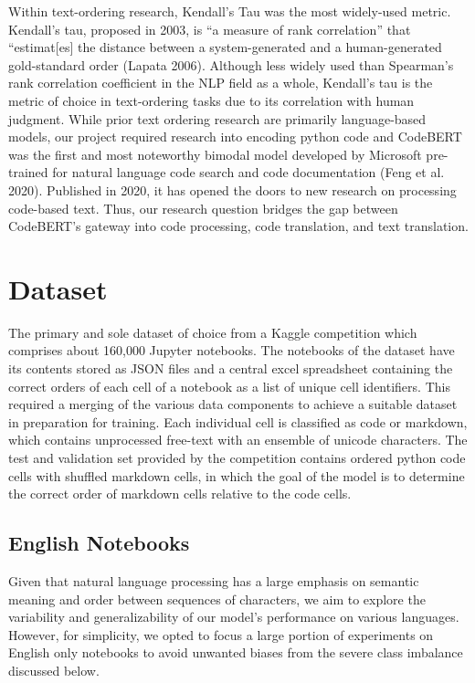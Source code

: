 \documentclass[conference]{IEEEtran}
\begin{document}
Within text-ordering research, Kendall’s Tau was the most widely-used metric. Kendall’s tau, proposed in 2003, is “a measure of rank correlation” that “estimat[es] the distance between a system-generated and a human-generated gold-standard order (Lapata 2006). Although less widely used than Spearman’s rank correlation coefficient in the NLP field as a whole, Kendall’s tau is the metric of choice in text-ordering tasks due to its correlation with human judgment. While prior text ordering research are primarily language-based models, our project required research into encoding python code and CodeBERT was the first and most noteworthy bimodal model developed by Microsoft pre-trained for natural language code search and code documentation (Feng et al. 2020). Published in 2020, it has opened the doors to new research on processing code-based text. Thus, our research question bridges the gap between CodeBERT’s gateway into code processing, code translation, and text translation.

\section{Dataset}
The primary and sole dataset of choice from a Kaggle competition which comprises about 160,000 Jupyter notebooks. The notebooks of the dataset have its contents stored as JSON files and a central excel spreadsheet containing the correct orders of each cell of a notebook as a list of unique cell identifiers. This required a merging of the various data components to achieve a suitable dataset in preparation for training. Each individual cell is classified as code or markdown, which contains unprocessed free-text with an ensemble of unicode characters. The test and validation set provided by the competition contains ordered python code cells with shuffled markdown cells, in which the goal of the model is to determine the correct order of markdown cells relative to the code cells.

\subsection{English Notebooks}
Given that natural language processing has a large emphasis on semantic meaning and order between sequences of characters, we aim to explore the variability and generalizability of our model’s performance on various languages. However, for simplicity, we opted to focus a large portion of experiments on English only notebooks to avoid unwanted biases from the severe class imbalance discussed below.
\end{document}
